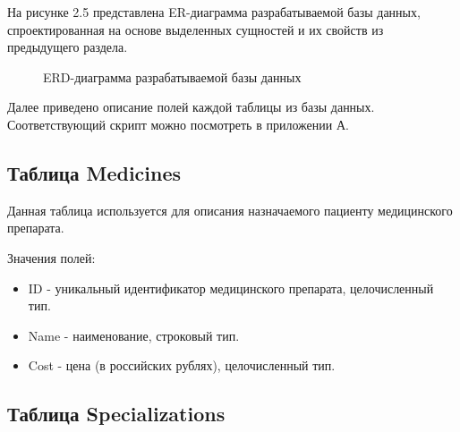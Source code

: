 На рисунке 2.5 представлена ER-диаграмма разрабатываемой базы данных, спроектированная на основе выделенных сущностей и их свойств из предыдущего раздела.

\begin{figure}[!h]
	\caption{ERD-диаграмма разрабатываемой базы данных}
\end{figure}

Далее приведено описание полей каждой таблицы из базы данных. Соответствующий скрипт можно посмотреть в приложении А.

\subsection*{Таблица Medicines}

Данная таблица используется для описания назначаемого пациенту медицинского препарата.

Значения полей:

\begin{itemize}
	\item ID - уникальный идентификатор медицинского препарата, целочисленный тип.
	\item Name - наименование, строковый тип.
	\item Cost - цена (в российских рублях), целочисленный тип.
\end{itemize}

\subsection*{Таблица Specializations}

